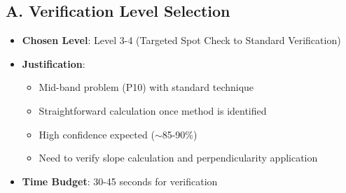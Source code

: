 \documentclass[12pt]{article}
\begin{document}
\begin{verificationbox}
\subsection*{A. Verification Level Selection}
\begin{itemize}[leftmargin=*]
    \item \textbf{Chosen Level}: Level 3-4 (Targeted Spot Check to Standard Verification)
    \item \textbf{Justification}: 
    \begin{itemize}
        \item Mid-band problem (P10) with standard technique
        \item Straightforward calculation once method is identified
        \item High confidence expected ($\sim$85-90\%)
        \item Need to verify slope calculation and perpendicularity application
    \end{itemize}
    \item \textbf{Time Budget}: 30-45 seconds for verification
\end{itemize}


\end{verificationbox}
\end{document}
